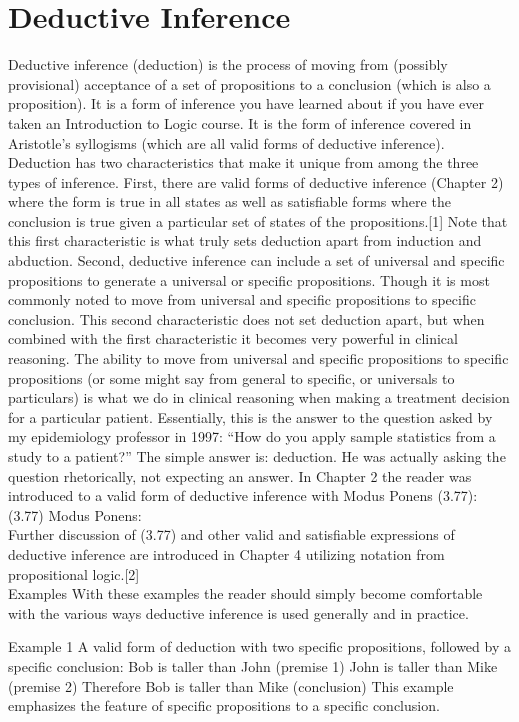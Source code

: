 \documentclass[
]{book}
\begin{document}
\hypertarget{deductive-inference}{%
\section{Deductive Inference}\label{deductive-inference}}

Deductive inference (deduction) is the process of moving from (possibly provisional) acceptance of a set of propositions to a conclusion (which is also a proposition). It is a form of inference you have learned about if you have ever taken an Introduction to Logic course. It is the form of inference covered in Aristotle's syllogisms (which are all valid forms of deductive inference). Deduction has two characteristics that make it unique from among the three types of inference. First, there are valid forms of deductive inference (Chapter 2) where the form is true in all states as well as satisfiable forms where the conclusion is true given a particular set of states of the propositions.{[}1{]} Note that this first characteristic is what truly sets deduction apart from induction and abduction. Second, deductive inference can include a set of universal and specific propositions to generate a universal or specific propositions. Though it is most commonly noted to move from universal and specific propositions to specific conclusion. This second characteristic does not set deduction apart, but when combined with the first characteristic it becomes very powerful in clinical reasoning. The ability to move from universal and specific propositions to specific propositions (or some might say from general to specific, or universals to particulars) is what we do in clinical reasoning when making a treatment decision for a particular patient. Essentially, this is the answer to the question asked by my epidemiology professor in 1997: ``How do you apply sample statistics from a study to a patient?'' The simple answer is: deduction. He was actually asking the question rhetorically, not expecting an answer.
In Chapter 2 the reader was introduced to a valid form of deductive inference with Modus Ponens (3.77):
(3.77) Modus Ponens:\\
Further discussion of (3.77) and other valid and satisfiable expressions of deductive inference are introduced in Chapter 4 utilizing notation from propositional logic.{[}2{]}\\
Examples
With these examples the reader should simply become comfortable with the various ways deductive inference is used generally and in practice.

Example 1
A valid form of deduction with two specific propositions, followed by a specific conclusion:
Bob is taller than John (premise 1)
John is taller than Mike (premise 2)
Therefore Bob is taller than Mike (conclusion)
This example emphasizes the feature of specific propositions to a specific conclusion.
\end{document}
